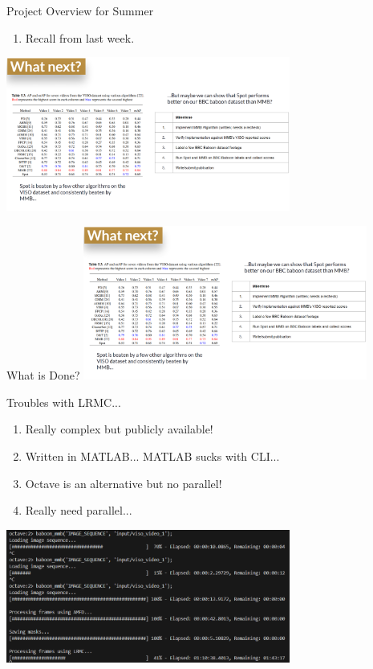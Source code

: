 \begin{frame}{Project Overview for Summer}
    \begin{enumerate}
        \item Recall from last week.
    \end{enumerate}
    \centering
    \includegraphics[height=0.7\textheight, width=0.7\textwidth, keepaspectratio]{images/bom/oldslide.png}
\end{frame}

\begin{frame}{What is Done?}
    \centering
    \includegraphics[height=0.7\textheight, width=0.7\textwidth, keepaspectratio]{images/bom/oldslide.png}
\end{frame}

\begin{frame}{Troubles with LRMC...}
    \begin{enumerate}
        \item Really complex but publicly available!
        \item Written in MATLAB... MATLAB sucks with CLI...
        \item Octave is an alternative but no parallel!
        \item Really need parallel...
    \end{enumerate}
    \centering
    \includegraphics[height=0.7\textheight, width=0.7\textwidth, keepaspectratio]{images/bom/image.png}
\end{frame}


